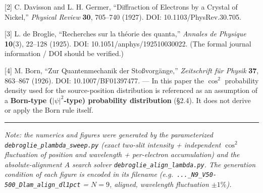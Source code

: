 \documentclass[11pt,a4paper]{article}
\begin{document}
{[}2{]} C. Davisson and L. H. Germer, ``Diffraction of Electrons by a
Crystal of Nickel,'' \emph{Physical Review} \textbf{30}, 705--740
(1927). DOI: 10.1103/PhysRev.30.705.

{[}3{]} L. de Broglie, ``Recherches sur la théorie des quanta,''
\emph{Annales de Physique} \textbf{10}(3), 22--128 (1925). DOI:
10.1051/anphys/192510030022. (The formal journal information / DOI
should be verified.)

{[}4{]} M. Born, ``Zur Quantenmechanik der Stoßvorgänge,''
\emph{Zeitschrift für Physik} \textbf{37}, 863--867 (1926). DOI:
10.1007/BF01397477. --- In this paper the \(\cos^2\) probability density
used for the source-position distribution is referenced as an assumption
of a \textbf{Born-type (\(|\psi|^2\)-type) probability distribution}
(§2.4). It does not derive or apply the Born rule itself.

\begin{center}\rule{0.5\linewidth}{0.5pt}\end{center}

\emph{Note: the numerics and figures were generated by the parameterized
\texttt{debroglie\_plambda\_sweep.py} (exact two-slit intensity +
independent \(\cos^2\) fluctuation of position and wavelength +
per-electron accumulation) and the absolute-alignment \(A\) search
solver \texttt{debroglie\_align\_lambda.py}. The generation condition of
each figure is encoded in its filename
(e.g.~\texttt{...\_N9\_V50-500\_Dlam\_align\_dl1pct} = \(N{=}9\),
aligned, wavelength fluctuation \(\pm1\%\)).}
\end{document}
